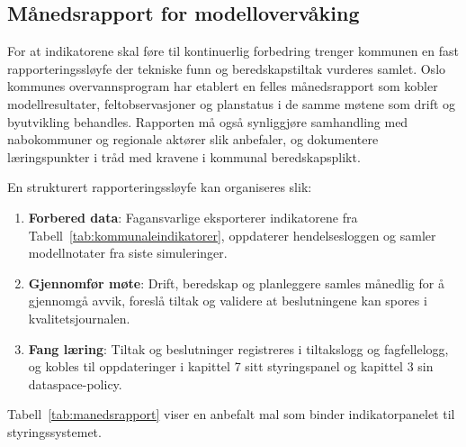 \subsection{Månedsrapport for modellovervåking}
For at indikatorene skal føre til kontinuerlig forbedring trenger kommunen en fast rapporteringssløyfe der tekniske funn og beredskapstiltak vurderes samlet. Oslo kommunes overvannsprogram har etablert en felles månedsrapport som kobler modellresultater, feltobservasjoner og planstatus i de samme møtene som drift og byutvikling behandles.\citep{oslo2023overvann} Rapporten må også synliggjøre samhandling med nabokommuner og regionale aktører slik \citet{ks2022samhandling} anbefaler, og dokumentere læringspunkter i tråd med kravene i kommunal beredskapsplikt.\citep{dsb2022beredskap}

En strukturert rapporteringssløyfe kan organiseres slik:
\begin{enumerate}
    \item \textbf{Forbered data}: Fagansvarlige eksporterer indikatorene fra Tabell~\ref{tab:kommunaleindikatorer}, oppdaterer hendelsesloggen og samler modellnotater fra siste simuleringer.
    \item \textbf{Gjennomfør møte}: Drift, beredskap og planleggere samles månedlig for å gjennomgå avvik, foreslå tiltak og validere at beslutningene kan spores i kvalitetsjournalen.
    \item \textbf{Fang læring}: Tiltak og beslutninger registreres i tiltakslogg og fagfellelogg, og kobles til oppdateringer i kapittel 7 sitt styringspanel og kapittel 3 sin dataspace-policy.
\end{enumerate}

Tabell~\ref{tab:manedsrapport} viser en anbefalt mal som binder indikatorpanelet til styringssystemet.

